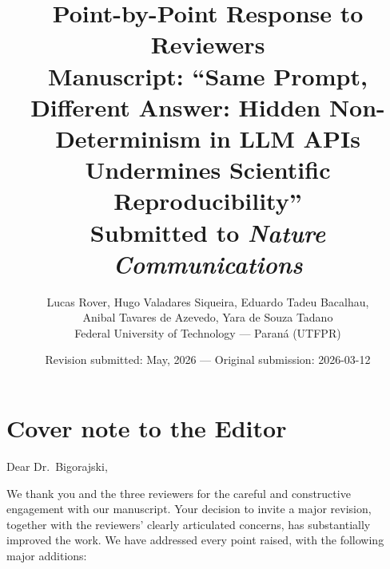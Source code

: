 \documentclass[11pt,a4paper]{article}
\title{\textbf{Point-by-Point Response to Reviewers} \\
\large Manuscript: ``Same Prompt, Different Answer: Hidden Non-Determinism in LLM APIs Undermines Scientific Reproducibility'' \\
\large Submitted to \emph{Nature Communications}}
\author{Lucas Rover, Hugo Valadares Siqueira, Eduardo Tadeu Bacalhau, \\
Anibal Tavares de Azevedo, Yara de Souza Tadano \\
Federal University of Technology --- Paraná (UTFPR)}
\date{Revision submitted: May, 2026 --- Original submission: 2026-03-12}
\begin{document}
\maketitle

\section*{Cover note to the Editor}

Dear Dr.\ Bigorajski,

We thank you and the three reviewers for the careful and constructive engagement with our manuscript. Your decision to invite a major revision, together with the reviewers' clearly articulated concerns, has substantially improved the work. We have addressed every point raised, with the following major additions:
\end{document}
